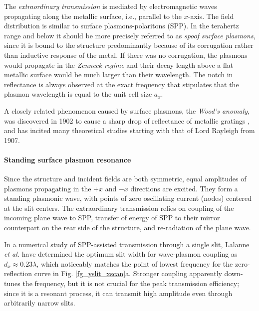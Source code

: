 The \textit{extraordinary transmission} is mediated by electromagnetic waves propagating along the metallic surface, i.e., parallel to the $x$-axis.  %
The field distribution is similar to surface plasmons-polaritons (SPP). In the terahertz range and below it should be more precisely referred to as \textit{spoof surface plasmons}, since it is bound to the structure predominantly because of its corrugation rather than inductive response of the metal. If there was no corrugation, the plasmons would propagate in the \textit{Zenneck regime} \cite{navarro-cia2013terahertz} and their decay length above a flat metallic surface would be much larger than their wavelength. 
The notch in reflectance is always observed at the exact frequency that stipulates that the plasmon wavelength is equal to the unit cell size $a_x$.

A closely related phenomenon  caused by surface plasmons, the \textit{Wood's anomaly}, was discovered in 1902 to cause a sharp drop of reflectance of metallic gratings \cite{wood1902remarkable}, and has incited many theoretical studies starting with that of Lord Rayleigh \cite{rayleigh1907dynamical} from 1907.  %

\paragraph{Standing surface plasmon resonance} %
Since the structure and incident fields are both symmetric, equal amplitudes of plasmons propagating in the $+x$ and $-x$ directions are excited. They form a standing plasmonic wave, with points of zero oscillating current (nodes) centered at the slit centers. The extraordinary transmission relies on coupling of the incoming plane wave to SPP, transfer of energy of SPP to their mirror counterpart on the rear side of the structure, and re-radiation of the plane wave. 

In a numerical study of SPP-assisted transmission through a single slit, Lalanne \textit{et al.} have determined \cite{lalanne2005theory} the optimum slit width for wave-plasmon coupling as $d_x \approx 0.23 \lambda$, which noticeably matches the point of lowest frequency for the zero-reflection curve in Fig. \ref{fg_yslit_xscan}a. Stronger coupling apparently down-tunes the frequency, but it is not crucial for the peak transmission efficiency; since it is a resonant process, it can transmit high amplitude even through arbitrarily narrow slits. 

